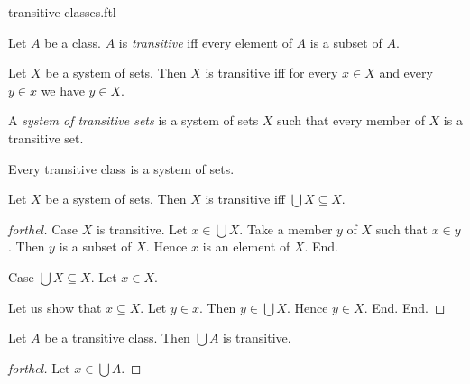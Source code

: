 \documentclass{naproche-library}
\begin{document}
\begin{smodule}[title=Transitive Classes]{transitive-classes.ftl}

\begin{definition}[forthel,id=SET_THEORY_01_8167915266244608]
  Let $A$ be a class.
  $A$ is \emph{transitive} iff every element of $A$ is a subset of $A$.
\end{definition}

\begin{proposition}[forthel,id=SET_THEORY_01_6964770955591680]
  Let $X$ be a system of sets.
  Then $X$ is transitive iff for every $x \in X$ and every $y \in x$ we have $y \in X$.
\end{proposition}

\begin{definition}[forthel,id=SET_THEORY_01_4219967964708864]
  A \emph{system of transitive sets} is a system of sets $X$ such that every member of $X$ is a transitive set.
\end{definition}

\begin{proposition}[forthel,id=SET_THEORY_01_2095807333400576]
  Every transitive class is a system of sets.
\end{proposition}

\begin{proposition}[forthel,id=SET_THEORY_01_6524117649981440]
  Let $X$ be a system of sets.
  Then $X$ is transitive iff $\bigcup X \subseteq X$.
\end{proposition}
\begin{proof}[forthel]
  Case $X$ is transitive.
    Let $x \in \bigcup X$.
    Take a member $y$ of $X$ such that $x \in y$.
    Then $y$ is a subset of $X$.
    Hence $x$ is an element of $X$.
  End.

  Case $\bigcup X \subseteq X$.
    Let $x \in X$.

    Let us show that $x \subseteq X$.
      Let $y \in x$.
      Then $y \in \bigcup X$.
      Hence $y \in X$.
    End.
  End.
\end{proof}

\begin{proposition}[forthel,id=SET_THEORY_01_620651482185728]
  Let $A$ be a transitive class.
  Then $\bigcup A$ is transitive.
\end{proposition}
\begin{proof}[forthel]
  Let $x \in \bigcup A$.


\end{proof}
\end{smodule}
\end{document}
